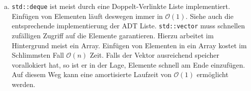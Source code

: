 \documentclass[11pt]{article}
\begin{document}
\begin{enumerate}[a)]
  \item
    \texttt{std::deque} ist meist durch eine Doppelt-Verlinkte Liste
    implementiert. Einf\"ugen von Elementen l\"auft deswegen immer
    in $\mathcal{O}(1)$. Siehe auch die entsprechende
    implementierung der ADT Liste. \texttt{std::vector} muss
    schnellen zuf\"alligen Zugriff auf die Elemente garantieren. Hierzu
    arbeitet im Hintergrund meist ein Array. Einf\"ugen von Elementen
    in ein Array kostet im Schlimmsten Fall $\mathcal{O}(n)$ Zeit.
    Falls der Vektor ausreichend speicher vorallokiert hat, so
    ist er in der Lage, Elemente schnell am Ende einzuf\"ugen. Auf diesem Weg 
    kann eine amortisierte Laufzeit von $\mathcal{O}(1)$ erm\"oglicht werden.


\end{enumerate}
\end{document}

